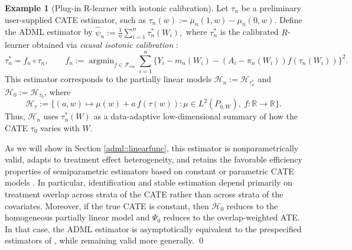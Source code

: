 \documentclass[11pt]{article}
\DeclareMathOperator*{\argmin}{argmin}
\theoremstyle{definition}
\newtheorem{example}{Example}
\begin{document}
\begin{example}[Plug-in R-learner with isotonic calibration]
\label{example::catecal}
Let \(\tau_n\) be a preliminary user-supplied CATE estimator, such as $\tau_n(w) := \mu_n(1,w) - \mu_n(0,w)$. Define the ADML estimator by $\widehat{\psi}_n:=\frac{1}{n}\sum_{i=1}^n \tau_n^*(W_i),$
where \(\tau_n^*\) is the calibrated \(R\)-learner obtained via \emph{causal isotonic calibration} \citep{van2023causal}:
\[
\tau_n^* = f_n \circ \tau_n, \qquad
f_n := \argmin_{f \in \mathcal{F}_{iso}} \sum_{i=1}^n \{Y_i - m_n(W_i) - (A_i - \pi_n(W_i))f(\tau_n(W_i))\}^2.
\]
This estimator corresponds to the partially linear models \(\mathcal{H}_n := \mathcal{H}_{\tau_n^*}\) and \(\mathcal{H}_0 := \mathcal{H}_{\tau_0}\), where
\[
\mathcal{H}_{\tau} := \{(a,w) \mapsto \mu(w) + a\,f(\tau(w)) : \mu \in L^2(P_{0,W}),\ f:\mathbb{R}\to\mathbb{R}\}.
\]
Thus, \(\mathcal{H}_n\) uses \(\tau_n^*(W)\) as a data-adaptive low-dimensional summary of how the CATE \(\tau_0\) varies with \(W\).




As we will show in Section \ref{adml::linearfunc}, this estimator is nonparametrically valid, adapts to treatment effect heterogeneity, and retains the favorable efficiency properties of semiparametric estimators based on constant or parametric CATE models \citep{robinson1988root, imbensOverlapEstimand2006, li2019overlapWeights}. In particular, identification and stable estimation depend primarily on treatment overlap across strata of the CATE rather than across strata of the covariates. Moreover, if the true CATE is constant, then \(\mathcal{H}_0\) reduces to the homogeneous partially linear model and \(\Psi_0\) reduces to the overlap-weighted ATE. In that case, the ADML estimator is asymptotically equivalent to the prespecified estimators of \cite{imbensOverlapEstimand2006, li2019overlapWeights}, while remaining valid more generally. \qed 
\end{example}
 




\end{document}
